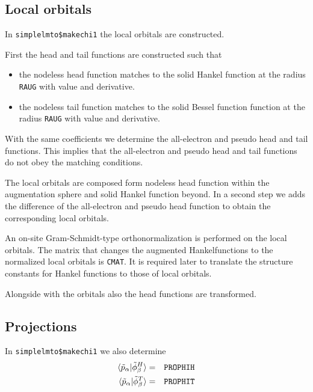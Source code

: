 \documentclass[11pt,a4paper]{report}
\begin{document}
\subsection{Local orbitals}
In \verb|simplelmto$makechi1| the local orbitals are constructed.

First the head and tail functions are constructed such that 
\begin{itemize}
\item the nodeless head function matches to the solid Hankel function
  at the radius \verb|RAUG| with value and derivative.
\item the nodeless tail function matches to the solid Bessel function
  function at the radius \verb|RAUG| with value and derivative.
\end{itemize}
With the same coefficients we determine the all-electron and pseudo
head and tail functions. This implies that the all-electron and pseudo
head and tail functions do not obey the matching conditions.

The local orbitals are composed form nodeless head function within the
augmentation sphere and solid Hankel function beyond. In a second step
we adds the difference of the all-electron and pseudo head function to
obtain the corresponding local orbitals.

An on-site Gram-Schmidt-type orthonormalization is performed on the
local orbitals. The matrix that changes the augmented Hankelfunctions
to the normalized local orbitals is \verb|CMAT|. It is required later
to translate the structure constants for Hankel functions to those of
local orbitals.

Alongside with the orbitals also the head functions are transformed.

\subsection{Projections}
In \verb|simplelmto$makechi1| we also determine
\begin{eqnarray}
\langle\tilde{p}_\alpha|\tilde{\phi}^H_\beta\rangle &=& \verb|PROPHIH|
\nonumber\\
\langle\tilde{p}_\alpha|\tilde{\phi}^T_\beta\rangle &=& \verb|PROPHIT|
\end{eqnarray}
\end{document}
